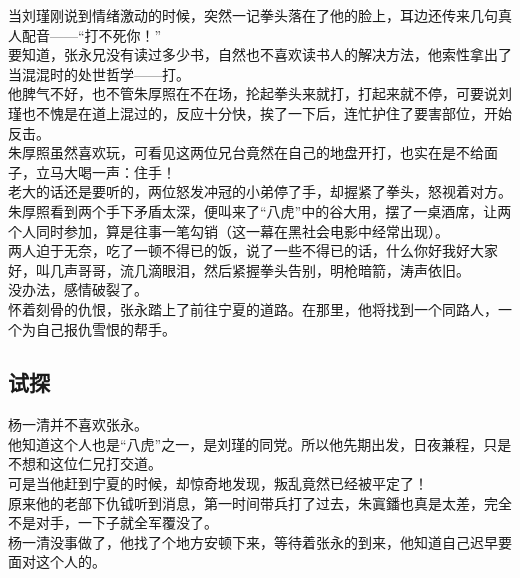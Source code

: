 \begin{multicols}{\theparacolNo}
当刘瑾刚说到情绪激动的时候，突然一记拳头落在了他的脸上，耳边还传来几句真人配音——“打不死你！”\\

要知道，张永兄没有读过多少书，自然也不喜欢读书人的解决方法，他索性拿出了当混混时的处世哲学——打。\\

他脾气不好，也不管朱厚照在不在场，抡起拳头来就打，打起来就不停，可要说刘瑾也不愧是在道上混过的，反应十分快，挨了一下后，连忙护住了要害部位，开始反击。\\

朱厚照虽然喜欢玩，可看见这两位兄台竟然在自己的地盘开打，也实在是不给面子，立马大喝一声：住手！\\

老大的话还是要听的，两位怒发冲冠的小弟停了手，却握紧了拳头，怒视着对方。\\

朱厚照看到两个手下矛盾太深，便叫来了“八虎”中的谷大用，摆了一桌酒席，让两个人同时参加，算是往事一笔勾销（这一幕在黑社会电影中经常出现）。\\

两人迫于无奈，吃了一顿不得已的饭，说了一些不得已的话，什么你好我好大家好，叫几声哥哥，流几滴眼泪，然后紧握拳头告别，明枪暗箭，涛声依旧。\\

没办法，感情破裂了。\\

怀着刻骨的仇恨，张永踏上了前往宁夏的道路。在那里，他将找到一个同路人，一个为自己报仇雪恨的帮手。\\

\subsection{试探}
杨一清并不喜欢张永。\\

他知道这个人也是“八虎”之一，是刘瑾的同党。所以他先期出发，日夜兼程，只是不想和这位仁兄打交道。\\

可是当他赶到宁夏的时候，却惊奇地发现，叛乱竟然已经被平定了！\\

原来他的老部下仇钺听到消息，第一时间带兵打了过去，朱寘鐇也真是太差，完全不是对手，一下子就全军覆没了。\\

杨一清没事做了，他找了个地方安顿下来，等待着张永的到来，他知道自己迟早要面对这个人的。\\


\end{multicols}
